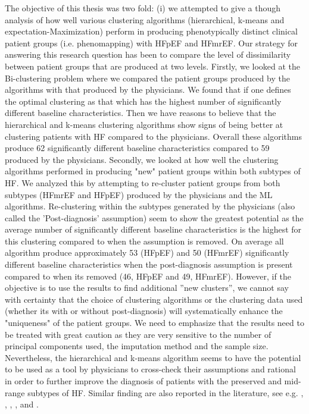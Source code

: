 \documentclass[../thesis.tex]{subfiles}
\begin{document}
\noindent The objective of this thesis was two fold: (i) we attempted to give a though analysis of how well various clustering algorithms (hierarchical, k-means and expectation-Maximization) perform in producing phenotypically distinct clinical patient groups (i.e. phenomapping) with HFpEF and HFmrEF. Our strategy for answering this research question has been to compare the level of dissimilarity between patient groups that are produced at two levels. Firstly, we looked at the Bi-clustering problem where we compared the patient groups produced by the algorithms with that produced by the physicians. We found that if one defines the optimal clustering as that which has the highest number of significantly different baseline characteristics. Then we have reasons to believe that the hierarchical and k-means clustering algorithms show signs of being better at clustering patients with HF compared to the physicians. Overall these algorithms produce 62 significantly different baseline characteristics compared to 59 produced by the physicians. Secondly, we looked at how well the clustering algorithms performed in producing "new" patient groups within both subtypes of HF. We analyzed this by attempting to re-cluster patient groups from both subtypes (HFmrEF and HFpEF) produced by the physicians and the ML algorithms. Re-clustering within the subtypes generated by the physicians (also called the 'Post-diagnosis' assumption) seem to show the greatest potential as the average number of significantly different baseline characteristics is the highest for this clustering compared to when the assumption is removed. On average all algorithm produce approximately 53 (HFpEF) and 50 (HFmrEF) significantly different baseline characteristics when the post-diagnosis assumption is present compared to when its removed (46, HFpEF and 49, HFmrEF). However, if the objective is to use the results to find additional ''new clusters'', we cannot say with certainty that the choice of clustering algorithms or the clustering data used (whether its with or without post-diagnosis) will systematically enhance the "uniqueness" of the patient groups. We need to emphasize that the results need to be treated with great caution as they are very sensitive to the number of principal components used, the imputation method and the sample size. Nevertheless, the hierarchical and k-means algorithm seems to have the potential to be used as a tool by physicians to cross-check their assumptions and rational in order to further improve the diagnosis of patients with the preserved and mid-range subtypes of HF. Similar finding are also reported in the literature, see e.g. \cite{shah2014phenomapping}, \cite{ahmad2014clinical}, \cite{alonso2015exploring}, \cite{kao2015characterization}, \cite{ahmad2016clinical} and \cite{katz2017phenomapping}.\\
\end{document}
